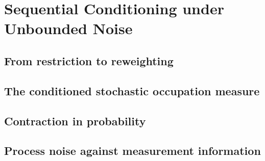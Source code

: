 
\section{Sequential Conditioning under Unbounded Noise}
\label{p3:sec:conditioning}

\subsection{From restriction to reweighting}
\label{p3:sub:from_restriction_to_reweighting}

\subsection{The conditioned stochastic occupation measure}
\label{p3:sub:conditioned_stochastic_measure}

\subsection{Contraction in probability}
\label{p3:sub:contraction_in_probability}

\subsection{Process noise against measurement information}
\label{p3:sub:process_against_measurement}
